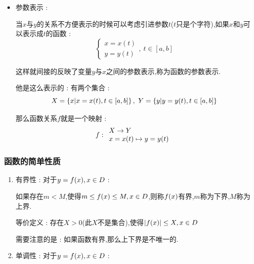 {{{{\begin{itemize}
{              这并不意味着这个函数关系无法讨论,只需要对$y$做限制,比如要求$y \geq 0$,这样一来对于给定的$y$,就有唯一确定的$x$,由此就构成了函数关系.

              需要注意的是并不是所有的隐函数都可以写出显式表达的形式,比如Kepler方程 : $$
                  y = x + \varepsilon \sin y
              $$

              这个方程描述了行星绕太阳运行的轨迹的规律,轨迹是个椭圆.其中$\varepsilon$是这个椭圆的离心,$x$与时间有关,$y$与行星的位置有关.
              }
        \item {
              参数表示 :

              当$x$与$y$的关系不方便表示的时候可以考虑引进参数$t$($t$只是个字符),如果$x$和$y$可以表示成$t$的函数 : $$
                  \begin{cases}
                      x = x(t) \\
                      y = y(t)
                  \end{cases},\ t \in [a,b]
              $$

              这样就间接的反映了变量$y$与$x$之间的参数表示,称为函数的参数表示.

              他是这么表示的 : 有两个集合 : $$
                  X = \left\{ x | x = x(t),t \in [a,b] \right\},\ Y = \left\{ y | y = y(t),t \in [a,b] \right\}
              $$

              那么函数关系$f$就是一个映射 : $$
                  f : \begin{array}{l} X \to Y \\ x = x(t) \mapsto y = y(t) \end{array}
              $$
              }
    \end{itemize}
}%

\subsubsection{函数的简单性质}{
    \begin{enumerate}
        \item {
              有界性 : 对于$y = f(x),x \in D$ :

              如果存在$m < M$,使得$m \leq f(x) \leq M,x \in D$,则称$f(x)$有界,$m$称为下界,$M$称为上界.

              等价定义 : 存在$X > 0$(此$X$不是集合),使得$\left\lvert f(x) \right\vert \leq X,x \in D$

              需要注意的是 : 如果函数有界,那么上下界是不唯一的.
              }
        \item {
              单调性 : 对于$y = f(x),x \in D$ :

}
\end{enumerate}}}}}
